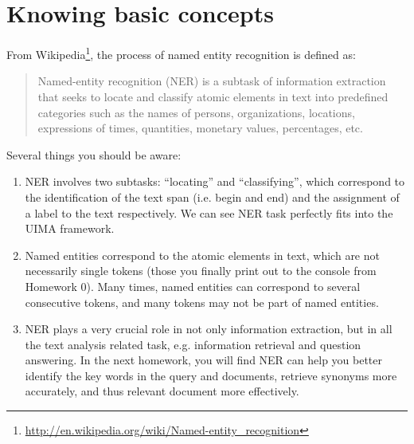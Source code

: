 
\section{Knowing basic concepts}

From
Wikipedia\footnote{\url{http://en.wikipedia.org/wiki/Named-entity_recognition}},
the process of named entity recognition is defined as:

\begin{quote}
Named-entity recognition (NER) is a subtask of information extraction that seeks
to locate and classify atomic elements in text into predefined categories such
as the names of persons, organizations, locations, expressions of times,
quantities, monetary values, percentages, etc.
\end{quote}

Several things you should be aware:

\begin{enumerate}

\item NER involves two subtasks: ``locating'' and ``classifying'', which
correspond to the identification of the text span (i.e. begin and end) and the
assignment of a label to the text respectively. We can see NER task perfectly
fits into the UIMA framework.

\item Named entities correspond to the atomic elements in text, which are not
necessarily single tokens (those you finally print out to the console from
Homework 0). Many times, named entities can correspond to several consecutive
tokens, and many tokens may not be part of named entities.

\item NER plays a very crucial role in not only information extraction, but in
all the text analysis related task, e.g. information retrieval and question
answering. In the next homework, you will find NER can help you better identify
the key words in the query and documents, retrieve synonyms more accurately, and
thus relevant document more effectively.
 
\end{enumerate}
